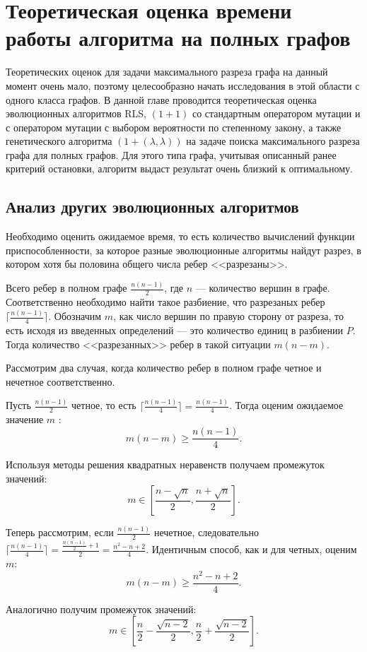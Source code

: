 \documentclass[times]{itmo-student-thesis}
\newcommand{\alglambda}{${(1 + (\lambda , \lambda))}$\xspace}
\begin{document}
\chapter{Теоретическая оценка времени работы алгоритма на полных графов}
Теоретических оценок для задачи максимального разреза графа на данный момент очень мало, поэтому целесообразно начать исследования в этой области с одного класса графов.
В данной главе проводится теоретическая оценка эволюционных алгоритмов RLS, $(1 + 1)$ со стандартным оператором мутации и с оператором мутации с выбором вероятности по степенному закону, а также генетического алгоритма \alglambda на задаче поиска максимального разреза графа для полных графов.
Для этого типа графа, учитывая описанный ранее критерий остановки, алгоритм выдаст результат очень близкий к оптимальному.

\section{Анализ других эволюционных алгоритмов}
Необходимо оценить ожидаемое время, то есть количество вычислений функции приспособленности, за которое разные эволюционные алгоритмы найдут разрез, в котором хотя бы половина общего числа ребер <<разрезаны>>.

Всего ребер в полном графе $\frac{n(n-1)}{2}$, где $n$ --- количество вершин в графе.
Соответственно необходимо найти такое разбиение, что разрезаных ребер $\lceil \frac{n(n-1)}{4} \rceil$.
Обозначим $m$, как число вершин по правую сторону от разреза, то есть исходя из введенных определений --- это количество единиц в разбиении $P$.
Тогда количество <<разрезанных>> ребер в такой ситуации $m(n-m)$.

Рассмотрим два случая, когда количество ребер в полном графе четное и нечетное соответственно.

Пусть $\frac{n(n-1)}{2}$ четное, то есть $\lceil \frac{n(n-1)}{4} \rceil = \frac{n(n-1)}{4}$.
Тогда оценим ожидаемое значение $m$ :
$$
  m(n-m) \ge \frac{n(n-1)}{4}.
$$

Используя методы решения квадратных неравенств получаем промежуток значений:
$$
m \in \left[\frac{n - \sqrt{n}}{2}, \frac{n + \sqrt{n}}{2}\right].
$$

Теперь рассмотрим, если $\frac{n(n-1)}{2}$ нечетное, следовательно $\lceil \frac{n(n-1)}{4} \rceil = \frac{\frac{n(n-1)}{2}+1}{2} = \frac{n^2-n+2}{4}$.
Идентичным способ, как и для четных, оценим $m$:
$$
  m(n-m) \ge \frac{n^2-n+2}{4}.
$$

Аналогично получим промежуток значений:
$$
m \in \left[\frac{n}{2} -\frac{\sqrt{n-2}}{2},  \frac{n}{2} + \frac{\sqrt{n-2}}{2}\right].
$$
\end{document}
